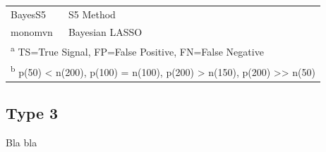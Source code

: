 \documentclass[
  11pt,
]{article}
\begin{document}
\begin{table}[!h]
\begin{tabular}[t]{>{}l|>{}l|>{}l|>{}l|>{}l|>{}l|>{}l|>{}l|>{}l|>{}l|>{}l|>{}l|>{}l|>{}l|>{}l|>{}l|>{}l|}
\hspace{1em}BayesS5 & S5 Method &  &  &  &  &  &  &  &  &  &  &  &  &  &  & \\
\hspace{1em}monomvn & Bayesian LASSO &  &  &  &  &  &  &  &  &  &  &  &  &  &  & \\
\bottomrule
\multicolumn{17}{l}{\textsuperscript{a} TS=True Signal, FP=False Positive, FN=False Negative}\\
\multicolumn{17}{l}{\textsuperscript{b} p(50) < n(200), p(100) = n(100), p(200) > n(150), p(200) >> n(50)}\\
\end{tabular}
\end{table}

\subsection{Type 3}

Bla bla
\end{document}
